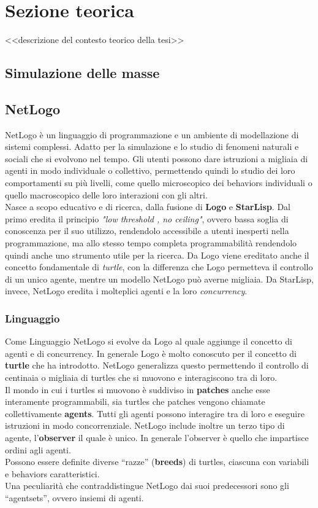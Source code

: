 \chapter{Sezione teorica}
<<descrizione del contesto teorico della tesi>>
\section{Simulazione delle masse}
 
\section {NetLogo} 
NetLogo è un linguaggio di programmazione e un ambiente di modellazione di sistemi complessi. Adatto per la simulazione e lo studio di fenomeni naturali e sociali che si evolvono nel tempo. Gli utenti possono dare istruzioni a migliaia di agenti in modo individuale o collettivo, permettendo quindi lo studio dei loro comportamenti su più livelli, come quello microscopico dei behaviors individuali o quello macroscopico delle loro interazioni con gli altri.\\
Nasce a scopo educativo e di ricerca, dalla fusione di \textbf{Logo} e \textbf{StarLisp}. Dal primo eredita il principio \textit{"low threshold , no ceiling"}, ovvero bassa soglia di conoscenza per il suo utilizzo, rendendolo accessibile a utenti inesperti nella programmazione, ma allo stesso tempo completa programmabilità rendendolo quindi anche uno strumento utile per la ricerca. Da Logo viene ereditato anche il concetto fondamentale di \textit{turtle}, con la differenza che Logo permetteva il controllo di un unico agente, mentre un modello NetLogo può averne migliaia. Da StarLisp, invece, NetLogo eredita i molteplici agenti e la loro \textit{concurrency}.\\
\subsection{Linguaggio}
Come Linguaggio NetLogo si evolve da Logo al quale aggiunge il concetto di agenti e di concurrency. In generale Logo è molto conoscuto per il concetto di \textbf{turtle} che ha introdotto. NetLogo generalizza questo permettendo il controllo di centinaia o migliaia di turtles che si muovono e interagiscono tra di loro.\\
Il mondo in cui i turtles si muovono è suddiviso in \textbf{patches} anche esse interamente programmabili, sia turtles che patches vengono chiamate collettivamente \textbf{agents}. Tutti gli agenti possono interagire tra di loro e eseguire istruzioni in modo concorrenziale. NetLogo include inoltre un terzo tipo di agente, l'\textbf{observer} il quale è unico. In generale l'observer è quello che impartisce ordini agli agenti.\\
Possono essere definite diverse “razze” (\textbf{breeds}) di turtles, ciascuna con variabili e behaviors caratteristici.\\
Una peculiarità che contraddistingue NetLogo dai suoi predecessori sono gli “agentsets”, ovvero insiemi di agenti.




 
